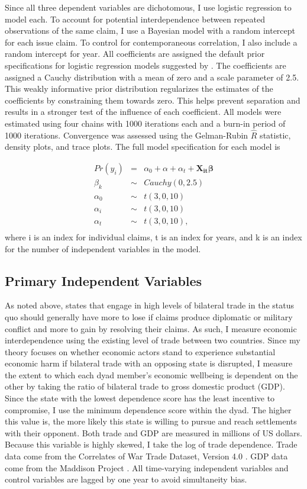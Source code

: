 \documentclass[../../dissertation.tex]{subfiles}
\begin{document}
Since all three dependent variables are dichotomous, I use logistic regression to model each. To account for potential interdependence between repeated observations of the same claim, I use a Bayesian model with a random intercept for each issue claim. To control for contemporaneous correlation, I also include a random intercept for year. All coefficients are assigned the default prior specifications for logistic regression models suggested by \citet{gelman2008}. The coefficients are assigned a Cauchy distribution with a mean of zero and a scale parameter of 2.5. This weakly informative prior distribution regularizes the estimates of the coefficients by constraining them towards zero. This helps prevent separation and results in a stronger test of the influence of each coefficient. All models were estimated using four chains with 1000 iterations each and a burn-in period of 1000 iterations. Convergence was assessed using the Gelman-Rubin $\hat{R}$ statistic, density plots, and trace plots. The full model specification for each model is

\begin{eqnarray*}
	Pr(y_i) &=& \alpha_0 + \alpha + \alpha_t + \mathbf{ X_{it} \beta} \\
	\beta_k &\sim& Cauchy(0, 2.5) \\
	\alpha_0 &\sim&t(3, 0, 10) \\
	\alpha_{i} &\sim&t(3, 0, 10) \\
	\alpha_{t} &\sim&t(3, 0, 10),  \\
\end{eqnarray*} where i is an index for individual claims, t is an index for years, and k is an index for the number of independent variables in the model. 
\subsection{Primary Independent Variables} 

As noted above, states that engage in high levels of bilateral trade in the status quo should generally have more to lose if claims produce diplomatic or military conflict and more to gain by resolving their claims. As such, I measure economic interdependence using the existing level of trade between two countries. Since my theory focuses on whether economic actors stand to experience substantial economic harm if bilateral trade with an opposing state is disrupted, I measure the extent to which each dyad member’s economic wellbeing is dependent on the other by taking the ratio of bilateral trade to gross domestic product (GDP). Since the state with the lowest dependence score has the least incentive to compromise, I use the minimum dependence score within the dyad. The higher this value is, the more likely this state is willing to pursue and reach settlements with their opponent. Both trade and GDP are measured in millions of US dollars. Because this variable is highly skewed, I take the log of trade dependence. Trade data come from the Correlates of War Trade Dataset, Version 4.0 \citep{barbieri2009}. GDP data come from the Maddison Project \citep{bolt2018}. All time-varying independent variables and control variables are lagged by one year to avoid simultaneity bias.
\end{document}

